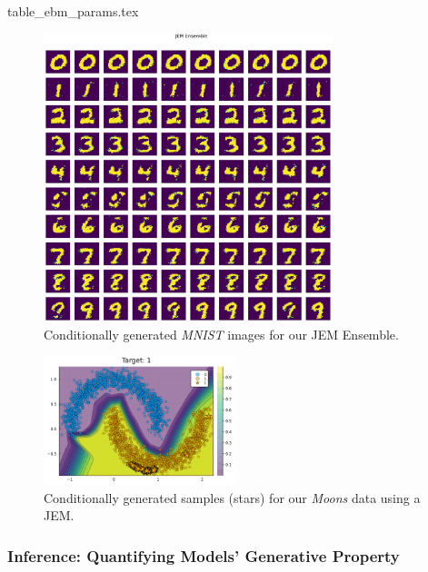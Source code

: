 \documentclass{article}
\begin{document}
{table_ebm_params.tex}

\begin{figure}
  \centering
  \includegraphics[width=0.75\textwidth]{../artifacts/results/images/mnist_generated_JEM Ensemble.png}
  \caption{Conditionally generated \textit{MNIST} images for our JEM Ensemble.}\label{fig:mnist-gen}
\end{figure}

\begin{figure}
  \centering
  \includegraphics[width=0.5\textwidth]{../artifacts/results/images/moons_generated_JEM.png}
  \caption{Conditionally generated samples (stars) for our \textit{Moons} data using a JEM.}\label{fig:moons-gen}
\end{figure}
\subsubsection{Inference: Quantifying Models' Generative Property}
\end{document}
